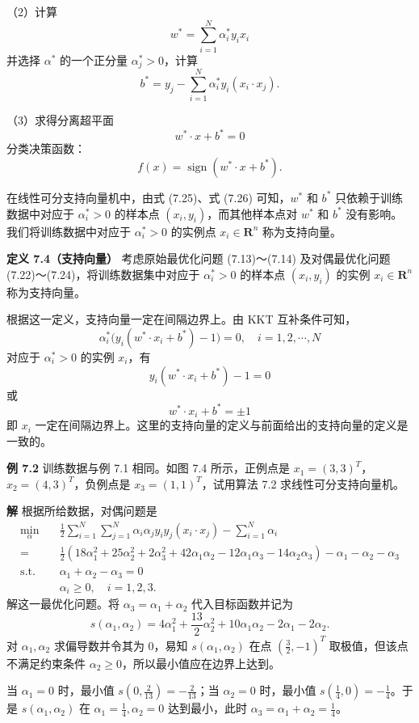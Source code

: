 \documentclass[UTF8, 12pt, fontset=fandol, oneside]{ctexart}
\begin{document}
（2）计算
\[
w^*=\sum_{i=1}^N\alpha_i^* y_i x_i
\]
并选择 $\alpha^*$ 的一个正分量 $\alpha_j^*>0$，计算
\[
b^*=y_j-\sum_{i=1}^N\alpha_i^*y_i(x_i\cdot x_j).
\]

（3）求得分离超平面
\[
w^*\cdot x+b^*=0
\]
分类决策函数：
\[
f(x)=\operatorname{sign}(w^*\cdot x+b^*).
\]

在线性可分支持向量机中，由式 (7.25)、式 (7.26) 可知，$w^*$ 和 $b^*$ 只依赖于训练数据中对应于 $\alpha_i^*>0$ 的样本点 $(x_i,y_i)$，而其他样本点对 $w^*$ 和 $b^*$ 没有影响。我们将训练数据中对应于 $\alpha_i^*>0$ 的实例点 $x_i\in\mathbf{R}^n$ 称为支持向量。

\noindent\textbf{定义 7.4（支持向量）}\quad
考虑原始最优化问题 (7.13)～(7.14) 及对偶最优化问题 (7.22)～(7.24)，将训练数据集中对应于 $\alpha_i^*>0$ 的样本点 $(x_i,y_i)$ 的实例 $x_i\in\mathbf{R}^n$ 称为支持向量。

根据这一定义，支持向量一定在间隔边界上。由 KKT 互补条件可知，
\[
\alpha_i^*\bigl(y_i(w^*\cdot x_i+b^*)-1\bigr)=0,\quad i=1,2,\cdots,N
\]
对应于 $\alpha_i^*>0$ 的实例 $x_i$，有
\[
y_i(w^*\cdot x_i+b^*)-1=0
\]
或
\[
w^*\cdot x_i+b^*=\pm 1
\]
即 $x_i$ 一定在间隔边界上。这里的支持向量的定义与前面给出的支持向量的定义是一致的。

\noindent\textbf{例 7.2}\quad
训练数据与例 7.1 相同。如图 7.4 所示，正例点是 $x_1=(3,3)^T$，$x_2=(4,3)^T$，负例点是 $x_3=(1,1)^T$，试用算法 7.2 求线性可分支持向量机。

\noindent\textbf{解}\quad
根据所给数据，对偶问题是
\[
\begin{aligned}
\min_\alpha\quad &
\frac{1}{2}\sum_{i=1}^N\sum_{j=1}^N\alpha_i\alpha_j y_i y_j(x_i\cdot x_j)-\sum_{i=1}^N\alpha_i\\
=&\frac{1}{2}(18\alpha_1^2+25\alpha_2^2+2\alpha_3^2+42\alpha_1\alpha_2-12\alpha_1\alpha_3-14\alpha_2\alpha_3)-\alpha_1-\alpha_2-\alpha_3\\
\mathrm{s.t.}\quad & \alpha_1+\alpha_2-\alpha_3=0\\
& \alpha_i\geq 0,\quad i=1,2,3.
\end{aligned}
\]
解这一最优化问题。将 $\alpha_3=\alpha_1+\alpha_2$ 代入目标函数并记为
\[
s(\alpha_1,\alpha_2)=4\alpha_1^2+\frac{13}{2}\alpha_2^2+10\alpha_1\alpha_2-2\alpha_1-2\alpha_2.
\]
对 $\alpha_1,\alpha_2$ 求偏导数并令其为 0，易知 $s(\alpha_1,\alpha_2)$ 在点 $\left(\frac{3}{2},-1\right)^T$ 取极值，但该点不满足约束条件 $\alpha_2\geq 0$，所以最小值应在边界上达到。

当 $\alpha_1=0$ 时，最小值 $s\left(0,\frac{2}{13}\right)=-\frac{2}{13}$；当 $\alpha_2=0$ 时，最小值 $s\left(\frac{1}{4},0\right)=-\frac{1}{4}$。于是 $s(\alpha_1,\alpha_2)$ 在 $\alpha_1=\frac{1}{4},\alpha_2=0$ 达到最小，此时 $\alpha_3=\alpha_1+\alpha_2=\frac{1}{4}$。
\end{document}
